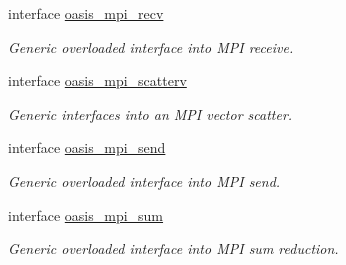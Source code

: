 \begin{DoxyCompactItemize}
interface \hyperlink{interfacemod__oasis__mpi_1_1oasis__mpi__recv}{oasis\+\_\+mpi\+\_\+recv}
\begin{DoxyCompactList}\small\item\em Generic overloaded interface into M\+P\+I receive. \end{DoxyCompactList}\item 
interface \hyperlink{interfacemod__oasis__mpi_1_1oasis__mpi__scatterv}{oasis\+\_\+mpi\+\_\+scatterv}
\begin{DoxyCompactList}\small\item\em Generic interfaces into an M\+P\+I vector scatter. \end{DoxyCompactList}\item 
interface \hyperlink{interfacemod__oasis__mpi_1_1oasis__mpi__send}{oasis\+\_\+mpi\+\_\+send}
\begin{DoxyCompactList}\small\item\em Generic overloaded interface into M\+P\+I send. \end{DoxyCompactList}\item 
interface \hyperlink{interfacemod__oasis__mpi_1_1oasis__mpi__sum}{oasis\+\_\+mpi\+\_\+sum}
\begin{DoxyCompactList}\small\item\em Generic overloaded interface into M\+P\+I sum reduction. \end{DoxyCompactList}\end{DoxyCompactItemize}
